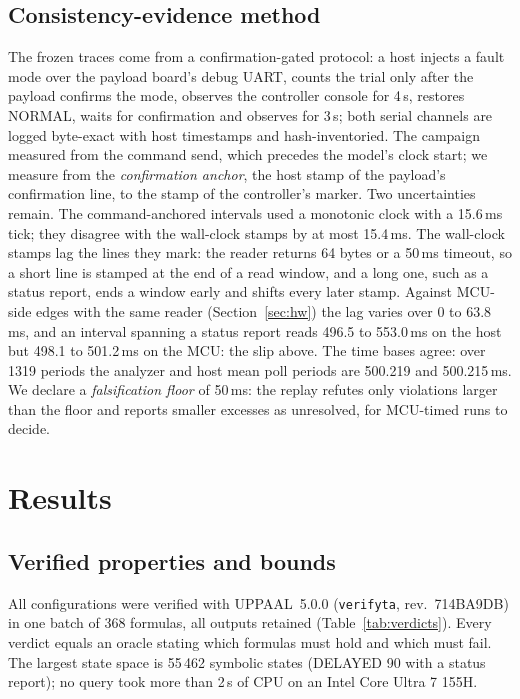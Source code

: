 \documentclass[conference,a4paper]{IEEEtran}
\begin{document}
\subsection{Consistency-evidence method}
\label{sec:confmethod}
The frozen traces come from a confirmation-gated protocol: a host injects a fault mode over the payload board's debug UART, counts the trial only after the payload confirms the mode, observes the controller console for 4\,s, restores NORMAL, waits for confirmation and observes for 3\,s; both serial channels are logged byte-exact with host timestamps and hash-inventoried. The campaign measured from the command send, which precedes the model's clock start; we measure from the \emph{confirmation anchor}, the host stamp of the payload's confirmation line, to the stamp of the controller's marker. Two uncertainties remain. The command-anchored intervals used a monotonic clock with a 15.6\,ms tick; they disagree with the wall-clock stamps by at most 15.4\,ms. The wall-clock stamps lag the lines they mark: the reader returns 64 bytes or a 50\,ms timeout, so a short line is stamped at the end of a read window, and a long one, such as a status report, ends a window early and shifts every later stamp. Against MCU-side edges with the same reader (Section~\ref{sec:hw}) the lag varies over 0 to 63.8\,ms, and an interval spanning a status report reads 496.5 to 553.0\,ms on the host but 498.1 to 501.2\,ms on the MCU: the slip above. The time bases agree: over 1319 periods the analyzer and host mean poll periods are 500.219 and 500.215\,ms. We declare a \emph{falsification floor} of 50\,ms: the replay refutes only violations larger than the floor and reports smaller excesses as unresolved, for MCU-timed runs to decide.


\section{Results}
\label{sec:results}
\subsection{Verified properties and bounds}
All configurations were verified with UPPAAL~5.0.0 (\texttt{verifyta}, rev.\ 714BA9DB) in one batch of 368 formulas, all outputs retained (Table~\ref{tab:verdicts}). Every verdict equals an oracle stating which formulas must hold and which must fail. The largest state space is 55\,462 symbolic states (DELAYED 90 with a status report); no query took more than 2\,s of CPU on an Intel Core Ultra 7 155H.
\end{document}
